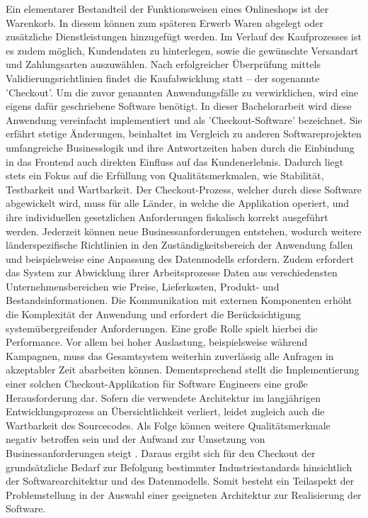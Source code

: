 Ein elementarer Bestandteil der Funktionsweisen eines Onlineshops ist der Warenkorb. In diesem können zum späteren Erwerb Waren abgelegt oder zusätzliche Dienstleistungen hinzugefügt werden. Im Verlauf des Kaufprozesses ist es zudem möglich, Kundendaten zu hinterlegen, sowie die gewünschte Versandart und Zahlungsarten auszuwählen. Nach erfolgreicher Überprüfung mittels Validierungsrichtlinien findet die Kaufabwicklung statt – der sogenannte 'Checkout'. Um die zuvor genannten Anwendungsfälle zu verwirklichen, wird eine eigens dafür geschriebene Software benötigt. In dieser Bachelorarbeit wird diese Anwendung vereinfacht implementiert und als 'Checkout-Software' bezeichnet. Sie erfährt stetige Änderungen, beinhaltet im Vergleich zu anderen Softwareprojekten umfangreiche Businesslogik und ihre Antwortzeiten haben durch die Einbindung in das Frontend auch direkten Einfluss auf das Kundenerlebnis. Dadurch liegt stets ein Fokus auf die Erfüllung von Qualitätsmerkmalen, wie Stabilität, Testbarkeit und Wartbarkeit. Der Checkout-Prozess, welcher durch diese Software abgewickelt wird, muss für alle Länder, in welche die Applikation operiert, und ihre individuellen gesetzlichen Anforderungen fiskalisch korrekt ausgeführt werden. Jederzeit können neue Businessanforderungen entstehen, wodurch weitere länderspezifische Richtlinien in den Zuständigkeitsbereich der Anwendung fallen und beispielsweise eine Anpassung des Datenmodells erfordern. Zudem erfordert das System zur Abwicklung ihrer Arbeitsprozesse Daten aus verschiedensten Unternehmensbereichen wie Preise, Lieferkosten, Produkt- und Bestandsinformationen. Die Kommunikation mit externen Komponenten erhöht die Komplexität der Anwendung und erfordert die Berücksichtigung systemübergreifender Anforderungen. Eine große Rolle spielt hierbei die Performance. Vor allem bei hoher Auslastung, beispielsweise während Kampagnen, muss das Gesamtsystem weiterhin zuverlässig alle Anfragen in akzeptabler Zeit abarbeiten können. Dementsprechend stellt die Implementierung einer solchen Checkout-Applikation für Software Engineers eine große Herausforderung dar. Sofern die verwendete Architektur im langjährigen Entwicklungsprozess an Übersichtlichkeit verliert, leidet zugleich auch die Wartbarkeit des Sourcecodes. Als Folge können weitere Qualitätsmerkmale negativ betroffen sein und der Aufwand zur Umsetzung von Businessanforderungen steigt \cite[S. 3f.]{Pigoski.2001}. Daraus ergibt sich für den Checkout der grundsätzliche Bedarf zur Befolgung bestimmter Industriestandards hinsichtlich der Softwarearchitektur und des Datenmodells. Somit besteht ein Teilaspekt der Problemstellung in der Auswahl einer geeigneten Architektur zur Realisierung der Software. 

